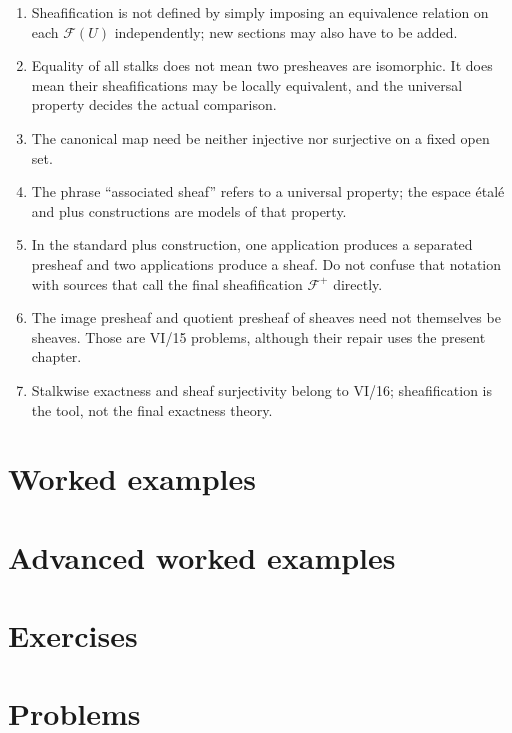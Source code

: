 \begin{enumerate}
\item Sheafification is not defined by simply imposing an equivalence relation on each
$\mathcal F(U)$ independently; new sections may also have to be added.
\item Equality of all stalks does not mean two presheaves are isomorphic.  It does mean their
sheafifications may be locally equivalent, and the universal property decides the actual
comparison.
\item The canonical map need be neither injective nor surjective on a fixed open set.
\item The phrase ``associated sheaf'' refers to a universal property; the espace
\'{e}tal\'{e} and plus constructions are models of that property.
\item In the standard plus construction, one application produces a separated presheaf and
two applications produce a sheaf.  Do not confuse that notation with sources that call the
final sheafification $\mathcal F^+$ directly.
\item The image presheaf and quotient presheaf of sheaves need not themselves be sheaves.
Those are VI/15 problems, although their repair uses the present chapter.
\item Stalkwise exactness and sheaf surjectivity belong to VI/16; sheafification is the tool,
not the final exactness theory.
\end{enumerate}

\section{Worked examples}


\section{Advanced worked examples}


\section{Exercises}

\ifdefined\IncludeExerciseHints

\fi

\section{Problems}


